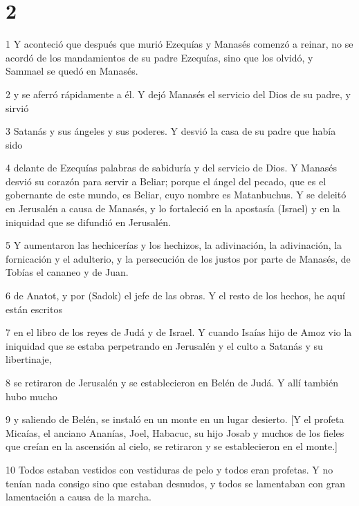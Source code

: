 \chapter{2}

\par 1 Y aconteció que después que murió Ezequías y Manasés comenzó a reinar, no se acordó de los mandamientos de su padre Ezequías, sino que los olvidó, y Sammael se quedó en Manasés.

\par 2 y se aferró rápidamente a él. Y dejó Manasés el servicio del Dios de su padre, y sirvió

\par 3 Satanás y sus ángeles y sus poderes. Y desvió la casa de su padre que había sido

\par 4 delante de Ezequías palabras de sabiduría y del servicio de Dios. Y Manasés desvió su corazón para servir a Beliar; porque el ángel del pecado, que es el gobernante de este mundo, es Beliar, cuyo nombre es Matanbuchus. Y se deleitó en Jerusalén a causa de Manasés, y lo fortaleció en la apostasía (Israel) y en la iniquidad que se difundió en Jerusalén.

\par 5 Y aumentaron las hechicerías y los hechizos, la adivinación, la adivinación, la fornicación y el adulterio, y la persecución de los justos por parte de Manasés, de Tobías el cananeo y de Juan.

\par 6 de Anatot, y por (Sadok) el jefe de las obras. Y el resto de los hechos, he aquí están escritos

\par 7 en el libro de los reyes de Judá y de Israel. Y cuando Isaías hijo de Amoz vio la iniquidad que se estaba perpetrando en Jerusalén y el culto a Satanás y su libertinaje,

\par 8 se retiraron de Jerusalén y se establecieron en Belén de Judá. Y allí también hubo mucho

\par 9 y saliendo de Belén, se instaló en un monte en un lugar desierto. [Y el profeta Micaías, el anciano Ananías, Joel, Habacuc, su hijo Josab y muchos de los fieles que creían en la ascensión al cielo, se retiraron y se establecieron en el monte.]

\par 10 Todos estaban vestidos con vestiduras de pelo y todos eran profetas. Y no tenían nada consigo sino que estaban desnudos, y todos se lamentaban con gran lamentación a causa de la marcha.

